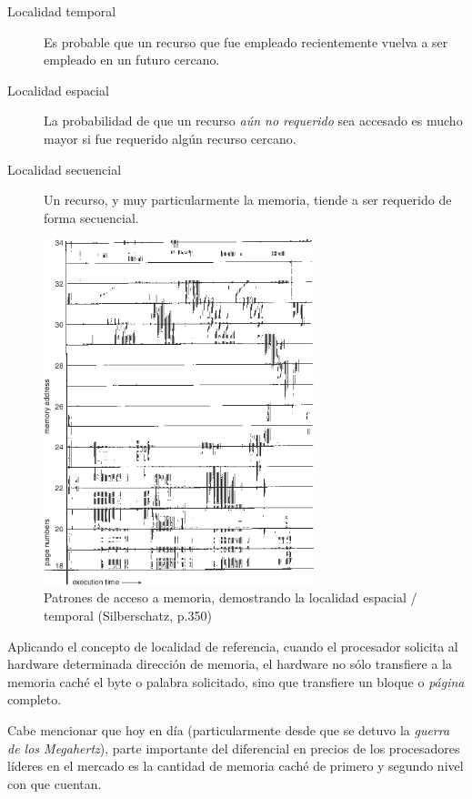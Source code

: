 \documentclass[11pt,fleqn]{book} %
\begin{document}
\begin{description}
\item[Localidad temporal] Es probable que un recurso que fue empleado
     recientemente vuelva a ser empleado en un futuro cercano.
\item[Localidad espacial] La probabilidad de que un recurso \emph{aún no      requerido} sea accesado es mucho mayor si fue requerido algún
     recurso cercano.
\item[Localidad secuencial] Un recurso, y muy particularmente la
     memoria, tiende a ser requerido de forma secuencial.
\end{description}

\begin{figure}[htb]
\centering
\includegraphics[width=0.7\textwidth]{./img/localidad_de_referencia.png}
\caption{\label{MEM_localidad_de_referencia}Patrones de acceso a memoria, demostrando la localidad espacial / temporal (Silberschatz, p.350)}
\end{figure}

Aplicando el concepto de localidad de referencia, cuando el procesador solicita
al hardware determinada dirección de memoria, el hardware no sólo
transfiere a la memoria caché el byte o palabra solicitado, sino que
transfiere un bloque o \emph{página} completo.

Cabe mencionar que hoy en día (particularmente desde que se detuvo la
\emph{guerra de los Megahertz}), parte importante del diferencial en precios
de los procesadores líderes en el mercado es la cantidad de memoria caché de
primero y segundo nivel con que cuentan.
\end{document}

